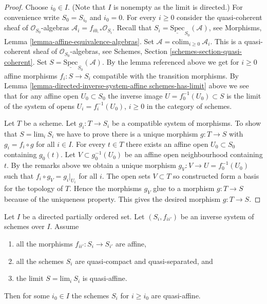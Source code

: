 \begin{proof}
Choose $i_0 \in I$. (Note that $I$ is nonempty as the limit is directed.)
For convenience write $S_0 = S_{i_0}$ and $i_0 = 0$.
For every $i \geq 0$ consider the quasi-coherent sheaf of
$\mathcal{O}_{S_0}$-algebras $\mathcal{A}_i = f_{i0,*}\mathcal{O}_{S_i}$.
Recall that $S_i = \underline{\text{Spec}}_{S_0}(\mathcal{A})$,
see Morphisms, Lemma \ref{lemma-affine-equivalence-algebras}.
Set $\mathcal{A} = \text{colim}_{i \geq 0}\ \mathcal{A}_i$.
This is a quasi-coherent sheaf of $\mathcal{O}_{S_0}$-algebras,
see Schemes, Section \ref{schemes-section-quasi-coherent}.
Set $S = \underline{\text{Spec}}_{S_0}(\mathcal{A})$.
By the lemma referenced above we get for $i \geq 0$ affine morphisms
$f_i : S \to S_i$ compatible with the transition morphisms.
By Lemma \ref{lemma-directed-inverse-system-affine schemes-has-limit} above
we see that for any affine open $U_0 \subset S_0$ the
inverse image $U = f_0^{-1}(U_0) \subset S$ is the limit of the
system of opens $U_i = f_i^{-1}(U_0)$, $i \geq 0$ in the
category of schemes.

\medskip\noindent
Let $T$ be a scheme. Let $g_i : T \to S_i$ be a compatible system
of morphisms. To show that $S = \text{lim}_i\ S_i$ we have
to prove there is a unique morphism $g : T \to S$ with
$g_i = f_i \circ g$ for all $i \in I$.
For every $t \in T$ there exists an affine open
$U_0 \subset S_0$ containing $g_0(t)$. Let $V \subset g_0^{-1}(U_0)$
be an affine open neighbourhood containing $t$.
By the remarks above we obtain a unique morphism
$g_V : V \to U = f_0^{-1}(U_0)$ such that $f_i \circ g_V = g_i|_{U_i}$
for all $i$. The open sets $V \subset T$ so constructed form
a basis for the topology of $T$. Hence the morphisms $g_V$ glue to a morphism
$g : T \to S$ because of the uniqueness property. This gives the
desired morphism $g : T \to S$.
\end{proof}

\begin{lemma}
\label{lemma-limit-quasi-affine}
Let $I$ be a directed partially ordered set.
Let $(S_i, f_{ii'})$ be an inverse system of
schemes over $I$. Assume
\begin{enumerate}
\item all the morphisms $f_{ii'} : S_i \to S_{i'}$ are affine,
\item all the schemes $S_i$ are quasi-compact and quasi-separated, and
\item the limit $S = \text{lim}_i\ S_i$ is quasi-affine.
\end{enumerate}
Then for some $i_0 \in I$ the schemes $S_i$ for $i \geq i_0$
are quasi-affine.
\end{lemma}

